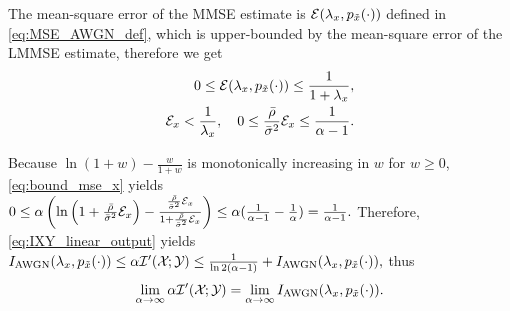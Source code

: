 \documentclass[12pt, draftclsnofoot,journal,onecolumn]{IEEEtran}
\begin{document}
The mean-square error of the MMSE estimate is $\mathcal{E}(\lambda_x,p_{\tilde{x}}(\cdot))$ defined in \eqref{eq:MSE_AWGN_def}, which is upper-bounded by the mean-square error of the LMMSE estimate, therefore we get 
\begin{align}
    0\leq \mathcal{E}(\lambda_x,p_{\tilde{x}}(\cdot))\leq \frac{1}{1+\lambda_x},
    \label{eq:MSE_vs_LMMSE}
\\
{\mathcal{E}}_{x}<\frac{1}{\lambda_x},\quad 0\leq \frac{\bar{\rho}}{\bar{\sigma}_{}^2}{\mathcal{E}}_{x}\leq \frac{1}{\alpha-1}.
    \label{eq:bound_mse_x}
\end{align}

Because $\ln(1+w)-\frac{w}{1+w}$ is monotonically increasing in $w$ for $w\geq 0$, \eqref{eq:bound_mse_x} yields $0\leq \alpha\left(\ln\left(1+\frac{\bar{\rho}}{\bar{\sigma}_{}^2}{\mathcal{E}}_{x}\right)-\frac{\frac{\bar{\rho}}{\bar{\sigma}_{}^2}{\mathcal{E}}_{x}}{1+\frac{\bar{\rho}}{\bar{\sigma}_{}^2}{\mathcal{E}}_{x}}\right)\leq \alpha(\frac{1}{\alpha-1}-\frac{1}{\alpha})=\frac{1}{\alpha-1}.$
Therefore,  \eqref{eq:IXY_linear_output} yields $I_{\rm AWGN}(\lambda_x,p_{\tilde{x}}(\cdot))\leq \alpha\mathcal{I}{'}({\mathcal{X}}_{};{\mathcal{Y}}_{}) \leq \frac{1}{\ln 2(\alpha-1)}+ I_{\rm AWGN}(\lambda_x,p_{\tilde{x}}(\cdot)),$
thus
\begin{align}
     \lim_{\alpha\to\infty}\alpha\mathcal{I}{'}({\mathcal{X}}_{};{\mathcal{Y}}_{})=\lim_{\alpha\to\infty}I_{\rm AWGN}(\lambda_x,p_{\tilde{x}}(\cdot)).
     \label{eq:linear_output_large_ratio_MuI}
\end{align}
\end{document}
